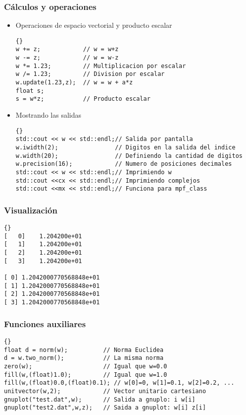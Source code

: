 \begin{frame}[fragile]
\frametitle{Cálculos y operaciones}
\begin{itemize}
\item Operaciones de espacio vectorial y producto escalar \\
{\footnotesize{\begin{lstlisting}{}
w += z;            // w = w+z
w -= z;            // w = w-z
w *= 1.23;         // Multiplicacion por escalar
w /= 1.23;         // Division por escalar
w.update(1.23,z);  // w = w + a*z
float s;
s = w*z;           // Producto escalar
\end{lstlisting}}}
\item Mostrando las salidas\\
{\footnotesize{\begin{lstlisting}{}
std::cout << w << std::endl;// Salida por pantalla
w.iwidth(2);                // Digitos en la salida del indice
w.width(20);                // Definiendo la cantidad de digitos
w.precision(16);            // Numero de posiciones decimales
std::cout << w << std::endl;// Imprimiendo w
std::cout <<cx << std::endl;// Imprimiendo complejos
std::cout <<mx << std::endl;// Funciona para mpf_class
\end{lstlisting}}}
\end{itemize}
\end{frame}

\begin{frame}[fragile]
\frametitle{Visualización}
{\footnotesize{\begin{lstlisting}{}
[   0]    1.204200e+01
[   1]    1.204200e+01
[   2]    1.204200e+01
[   3]    1.204200e+01

[ 0] 1.2042000770568848e+01
[ 1] 1.2042000770568848e+01
[ 2] 1.2042000770568848e+01
[ 3] 1.2042000770568848e+01
\end{lstlisting}}}
\end{frame}

\begin{frame}[fragile]
\frametitle{Funciones auxiliares}
{\footnotesize{\begin{lstlisting}{}
float d = norm(w);          // Norma Euclidea
d = w.two_norm();           // La misma norma
zero(w);                    // Igual que w=0.0
fill(w,(float)1.0);         // Igual que w=1.0
fill(w,(float)0.0,(float)0.1); // w[0]=0, w[1]=0.1, w[2]=0.2, ...
unitvector(w,2);            // Vector unitario cartesiano
gnuplot("test.dat",w);      // Salida a gnuplo: i w[i]
gnuplot("test2.dat",w,z);   // Saida a gnuplot: w[i] z[i]
\end{lstlisting}}}
\end{frame}


